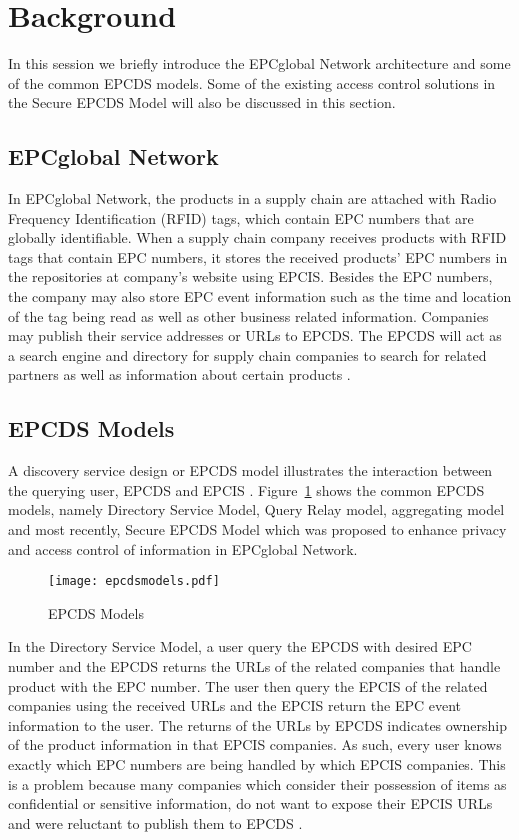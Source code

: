 \documentclass[conference]{IEEEtran}
\begin{document}
\section{Background}
\label{sec:background}
In this session we briefly introduce the EPCglobal Network architecture and some of the common EPCDS models. Some of the existing access control solutions in the Secure EPCDS Model will also be discussed in this section.

\subsection {EPCglobal Network}
In EPCglobal Network, the products in a supply chain are attached with Radio Frequency Identification (RFID) tags, which contain EPC numbers that are globally identifiable. When a supply chain company receives products with RFID tags that contain EPC numbers, it stores the received products' EPC numbers in the repositories at company's website using EPCIS. Besides the EPC numbers, the company may also store EPC event information such as the time and location of the tag being read as well as other business related information. Companies may publish their service addresses or URLs to EPCDS. The EPCDS will act as a search engine and directory for supply chain companies to search for related partners as well as information about certain products \cite{kywe:evaluation}.    

\subsection {EPCDS Models}
A discovery service design or EPCDS model illustrates the interaction between the querying user, EPCDS and EPCIS \cite{kur:dis}. Figure~\ref{fig:epcds} shows the common EPCDS models, namely Directory Service Model, Query Relay model, aggregating model and most recently, Secure EPCDS Model which was proposed to enhance privacy and access control of information in EPCglobal Network.  

\begin{figure}[h]
\begin{center}
\texttt{[image: epcdsmodels.pdf]}
\caption{EPCDS Models\label{fig:epcds}}
\end{center}
\end{figure}

In the Directory Service Model, a user query the EPCDS with desired EPC number and the EPCDS returns the URLs of the related companies that handle product with the EPC number. The user then query the EPCIS of the related companies using the received URLs and the EPCIS return the EPC event information to the user. The returns of the URLs by EPCDS indicates ownership of the product information in that EPCIS companies. As such, every user knows exactly which EPC numbers are being handled by which EPCIS companies. This is a problem because many companies which consider their possession of items as confidential or sensitive information, do not want to expose their EPCIS URLs and were reluctant to publish them to EPCDS \cite{ben:sec}. 
\end{document}
